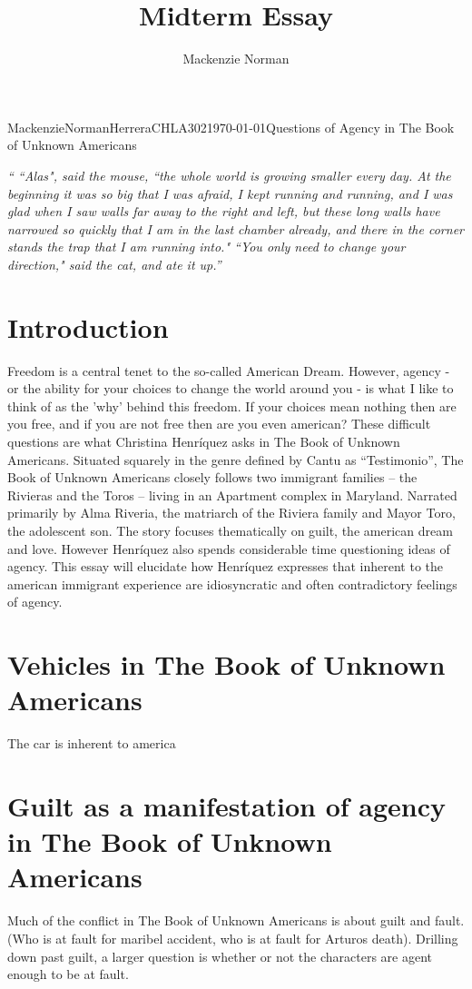 \documentclass{article}
\title{Midterm Essay}
\author{Mackenzie Norman}
\begin{document}
\begin{mla}{Mackenzie}{Norman}{Herrera}{CHLA302}{\today}{Questions of Agency in The Book of Unknown Americans}

\noindent\textit{`` ``Alas", said the mouse, ``the whole world is growing smaller every day. At the beginning it was so big that I was afraid, I kept running and running, and I was glad when I saw walls far away to the right and left, but these long walls have narrowed so quickly that I am in the last chamber already, and there in the corner stands the trap that I am running into." \linebreak \linebreak ``You only need to change your direction," said the cat, and ate it up.''}

\section*{Introduction}
Freedom is a central tenet to the so-called American Dream. However, agency - or the ability for your choices to change the world around you - is what I like to think of as the 'why' behind this freedom. If your choices mean nothing then are you free, and if you are not free then are you even american? These difficult questions are what Christina Henríquez asks in The Book of Unknown Americans. Situated squarely in the genre defined by Cantu as ``Testimonio''\cite{testimonio}, The Book of Unknown Americans closely follows two immigrant families -- the Rivieras and the Toros -- living in an Apartment complex in Maryland. Narrated primarily by Alma Riveria, the matriarch of the Riviera family and Mayor Toro, the adolescent son. The story focuses thematically on guilt, the american dream and love. However Henríquez also spends considerable time questioning ideas of agency. This essay will elucidate how Henríquez expresses that inherent to the american immigrant experience are idiosyncratic and often contradictory feelings of agency.

\section*{Vehicles in The Book of Unknown Americans}
The car is inherent to america 

\section*{Guilt as a manifestation of agency in The Book of Unknown Americans}
Much of the conflict in The Book of Unknown Americans is about guilt and fault. (Who is at fault for maribel accident, who is at fault for Arturos death). Drilling down past guilt, a larger question is whether or not the characters are agent enough to be at fault. 

\end{mla}
\end{document}
